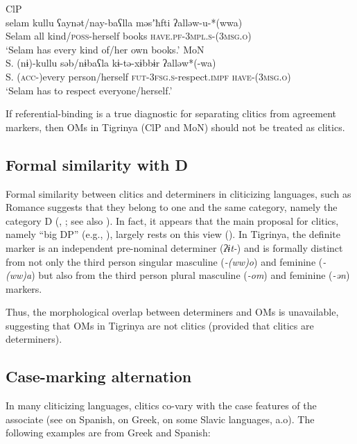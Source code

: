 \documentclass[output=paper]{langscibook}
\begin{document}
\ea\label{ex:Gebregziabher:anaphor1} ClP \\
\gll selam kullu ʕaynət/nay-baʕlla məsʼħfti ʔalləw-u-*(wwa) \\ 
Selam all kind/{\scshape poss}-herself books {\scshape have.pf-3mpl.s-(3msg.o}) \\
\glt `Selam has every kind of/her own books.'
\ex\label{ex:Gebregziabher:anaphor2} MoN \\
\gll S. (nɨ)-kullu səb/nɨbaʕla kɨ-tə-xɨbbɨr ʔalləw*(-wa)  \\ 
S. ({\scshape acc}-)every person/herself {\scshape fut-3fsg.s}-respect.{\scshape impf} {\scshape have-(3msg.o})\\
\glt `Selam has to respect everyone/herself.'
\z


\noindent If referential-binding is a true diagnostic for separating clitics from agreement markers, then OMs in Tigrinya (ClP and MoN) should not be treated as clitics.


\subsection{Formal similarity with D}
Formal similarity between clitics and determiners in cliticizing languages, such as Romance suggests that they belong to one and the same category, namely the category D (\citealt{bleam99}, \citealt{uri95}; see also \citealt{preminger14}). In fact, it appears that the main proposal for clitics, namely ``big DP'' (e.g., \citealt{nevins11a}), largely rests on this view (\citealt{bleam99}). 
In Tigrinya, the definite marker is an independent pre-nominal determiner (\emph{ʔɨt-}) and is formally distinct from not only the third person singular masculine (\emph{-(ww)o}) and feminine (\emph{-(ww)a}) but also from the third person plural masculine (\emph{-om}) and feminine (\emph{-ən}) markers. 

Thus, the morphological overlap between determiners and OMs is unavailable, suggesting that OMs in Tigrinya are not clitics (provided that clitics are determiners). 


\subsection{Case-marking alternation}\label{ex:Gebregziabher:Case}

In many cliticizing languages, clitics co-vary with the case features of the associate (see \citealt{romero10} on Spanish, \citealt{ana17} on Greek, \citealt{kallulli08} on some Slavic languages, a.o). The following examples are from Greek and Spanish:
\end{document}
